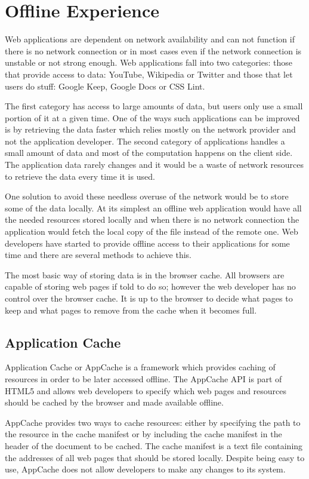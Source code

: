 \documentclass[10pt,a4paper,twoside]{book}
\begin{document}
\section{Offline Experience}
Web applications are dependent on network availability and can not function if there is no network connection or in most cases even if the network connection is unstable or not strong enough. Web applications fall into two categories: those that provide access to data: YouTube, Wikipedia or Twitter and those that let users do stuff: Google Keep, Google Docs or CSS Lint.

The first category has access to large amounts of data, but users only use a small portion of it at a given time. One of the ways such applications can be improved is by retrieving the data faster which relies mostly on the network provider and not the application developer. The second category of applications handles a small amount of data and most of the computation happens on the client side. 	The application data rarely changes and it would be a waste of network resources to retrieve the data every time it is used. 

One solution to avoid these needless overuse of the network would be to store some of the data locally. At its simplest an offline web application would have all the needed resources stored locally and when there is no network connection the application would fetch the local copy of the file instead of the remote one.  Web developers have started to provide offline access to their applications for some time and there are several methods to achieve this.

The most basic way of storing data is in the browser cache. All browsers are capable of storing web pages if told to do so; however the web developer has no control over the browser cache. It is up to the browser to decide what pages to keep and what pages to remove from the cache when it becomes full. 

\subsection{Application Cache}
Application Cache or AppCache is a framework which provides caching of resources in order to be later accessed offline. The AppCache API is part of HTML5 and allows web developers to specify which web pages and resources should be cached by the browser and made available offline.

AppCache provides two ways to cache resources: either by specifying the path to the resource in the cache manifest or by including the cache manifest in the header of the document to be cached. The cache manifest is a text file containing the addresses of all web pages that should be stored locally. Despite being easy to use, AppCache does not allow developers to make any changes to its system. 
\end{document}
